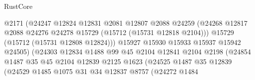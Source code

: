 \begin{lexlean}{RustCore}
\begin{coremodule}
                                        @2171
                                        (@24247
                                          @12824
                                          @12831
                                          @2081
                                          @12807
                                          @2088
                                          @24259
                                          (@24268
                                            @12817
                                            @2088
                                            @24276
                                            @24278
                                            @15729
                                            (@15712 (@15731 @12818 @2104)))
                                          @15729
                                          (@15712 (@15731 @12808 @12824)))
                                        @15927
                                        @15930
                                        @15933
                                        @15937
                                        @15942
                                        @24505)
                                      (@24303
                                        @12834
                                        @1488
                                        @99
                                        @45
                                        @2104
                                        @12841
                                        @2104
                                        @2198
                                        (@24854
                                          @1487
                                          @35
                                          @45
                                          @2104
                                          @12839
                                          @2125
                                          @1623
                                          (@24525
                                            @1487
                                            @35
                                            @12839
                                            (@24529
                                              @1485
                                              @1075
                                              @31
                                              @34
                                              @12837
                                              @8757
                                              (@24272
                                                @1484

\end{coremodule}
\end{lexlean}
